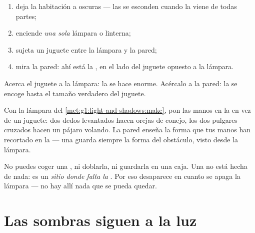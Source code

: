 \begin{method}\label{met:g1:light-and-shadows:make}
\begin{enumerate}
  \item deja la habitación a oscuras --- las  se esconden
        cuando la  viene de todas partes;
  \item enciende \emph{una sola} lámpara o linterna;
  \item sujeta un juguete entre la lámpara y la pared;
  \item mira la pared: ahí está la , en el lado del juguete
        opuesto a la lámpara.
\end{enumerate}
Acerca el juguete a la lámpara: la  se hace enorme. Acércalo a
la pared: la  se encoge hasta el tamaño verdadero del
juguete.
\end{method}

\begin{example}\label{ex:g1:light-and-shadows:animals}
Con la lámpara del \cref{met:g1:light-and-shadows:make}, pon las manos
en la  en vez de un juguete: dos dedos levantados hacen orejas de
conejo, los dos pulgares cruzados hacen un pájaro volando. La pared
enseña la forma que tus manos han recortado en la  --- una 
guarda siempre la forma del obstáculo, visto desde la lámpara.
\end{example}

\begin{remark}\label{rem:g1:light-and-shadows:notathing}
No puedes coger una , ni doblarla, ni guardarla en una caja.
Una  no está hecha de nada: es un \emph{sitio donde falta la
}. Por eso desaparece en cuanto se apaga la lámpara --- no hay
allí nada que se pueda quedar.
\end{remark}

\section{Las sombras siguen a la luz}

